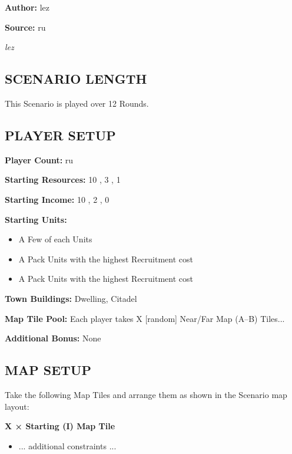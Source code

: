 
\begin{multicols*}{2}

\textbf{Author:} lez

\textbf{Source:} ru

\textit{lez}

\subsection*{\MakeUppercase{Scenario Length}}

This Scenario is played over 12 Rounds.

\subsection*{\MakeUppercase{Player Setup}}

\textbf{Player Count:} ru

\textbf{Starting Resources:} 10 , 3 , 1 

\textbf{Starting Income:} 10 , 2 , 0 

\textbf{Starting Units:}
\begin{itemize}
  \item A Few of each  Units
  \item A Pack  Units with the highest Recruitment cost
  \item A Pack  Units with the highest Recruitment cost
\end{itemize}

\textbf{Town Buildings:}  Dwelling, Citadel

\textbf{Map Tile Pool:} Each player takes X [random] Near/Far Map (A--B) Tiles...

\textbf{Additional Bonus:} None

\subsection*{\MakeUppercase{Map Setup}}

Take the following Map Tiles and arrange them as shown in the Scenario map layout:

\textbf{X × Starting (I) Map Tile}
\begin{itemize}
    \item ... additional constraints ...
\end{itemize}


\end{multicols*}
